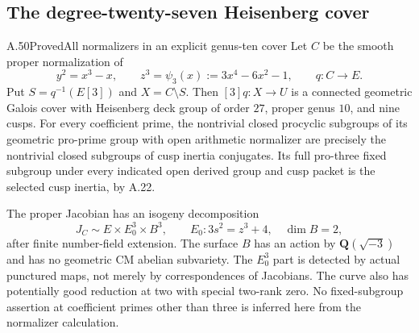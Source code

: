 \subsection{The degree-twenty-seven Heisenberg cover}

\begin{statement}{A.50}{Proved}{All normalizers in an explicit genus-ten cover}
Let \(C\) be the smooth proper normalization of
\[
 y^2=x^3-x,\qquad z^3=\psi_3(x):=3x^4-6x^2-1,
 \qquad q:C\longrightarrow E.                         \tag{A.50.1}
\]
Put \(S=q^{-1}(E[3])\) and \(X=C\setminus S\).
Then \([3]q:X\to U\) is a connected geometric Galois
cover with Heisenberg deck group of order \(27\),
proper genus \(10\), and nine cusps.
For every coefficient prime, the nontrivial closed
procyclic subgroups of its geometric pro-prime group
with open arithmetic normalizer are precisely the
nontrivial closed subgroups of cusp inertia conjugates.
Its full pro-three fixed subgroup under every indicated
open derived group and cusp packet is the selected
cusp inertia, by A.22.

The proper Jacobian has an isogeny decomposition
\[
              J_C\sim E\times E_0^3\times B^3,
       \qquad E_0:3s^2=z^3+4,\quad \dim B=2,           \tag{A.50.2}
\]
after finite number-field extension. The surface
\(B\) has an action by \(\mathbf Q(\sqrt{-3})\)
and has no geometric CM abelian subvariety.
The \(E_0^3\) part is detected by actual punctured
maps, not merely by correspondences of Jacobians.
The curve also has potentially good reduction at two
with special two-rank zero.
No fixed-subgroup assertion at coefficient primes
other than three is inferred here from the normalizer
calculation.
\end{statement}

